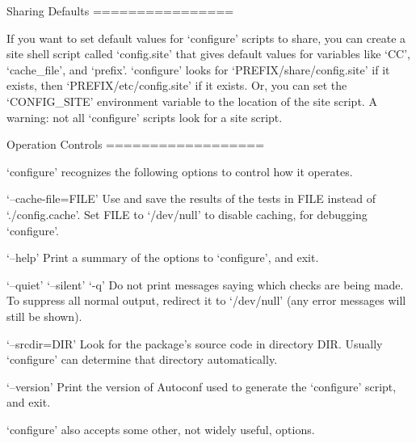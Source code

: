 \begin{DoxyCodeInclude}
Sharing Defaults
================

   If you want to set default values for `configure' scripts to share,
you can create a site shell script called `config.site' that gives
default values for variables like `CC', `cache_file', and `prefix'.
`configure' looks for `PREFIX/share/config.site' if it exists, then
`PREFIX/etc/config.site' if it exists.  Or, you can set the
`CONFIG_SITE' environment variable to the location of the site script.
A warning: not all `configure' scripts look for a site script.

Operation Controls
==================

   `configure' recognizes the following options to control how it
operates.

`--cache-file=FILE'
     Use and save the results of the tests in FILE instead of
     `./config.cache'.  Set FILE to `/dev/null' to disable caching, for
     debugging `configure'.

`--help'
     Print a summary of the options to `configure', and exit.

`--quiet'
`--silent'
`-q'
     Do not print messages saying which checks are being made.  To
     suppress all normal output, redirect it to `/dev/null' (any error
     messages will still be shown).

`--srcdir=DIR'
     Look for the package's source code in directory DIR.  Usually
     `configure' can determine that directory automatically.

`--version'
     Print the version of Autoconf used to generate the `configure'
     script, and exit.

`configure' also accepts some other, not widely useful, options.
\end{DoxyCodeInclude}
 